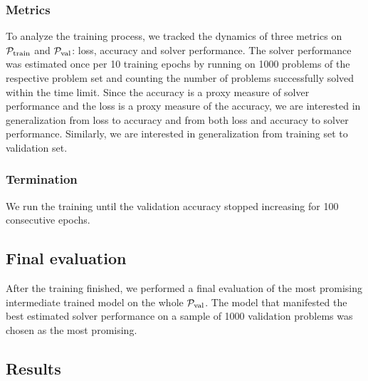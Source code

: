 \subsubsection{Metrics}
To analyze the training process,
we tracked the dynamics of three metrics on $\operatorname{\mathcal{P}_{\mathrm{train}}}$ and $\operatorname{\mathcal{P}_{\mathrm{val}}}$:
loss, accuracy and solver performance.
The solver performance was estimated once per 10 training epochs by running \Vampire{}
on \num{1000} problems of the respective problem set
and counting the number of problems successfully solved within the time limit.
Since the accuracy is a proxy measure of solver performance and the loss is a proxy measure of the accuracy,
we are interested in generalization from loss to accuracy and from both loss and accuracy to solver performance.
Similarly, we are interested in generalization from training set to validation set.

\subsubsection{Termination}
We run the training until the validation accuracy stopped increasing for 100 consecutive epochs.

\subsection{Final evaluation}

After the training finished,
we performed a final evaluation of the most promising intermediate trained model on the whole $\operatorname{\mathcal{P}_{\mathrm{val}}}$.
The model that manifested the best estimated solver performance on a sample of \num{1000} validation problems
was chosen as the most promising.

\subsection{Results}

